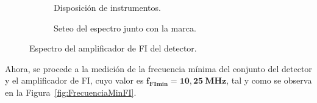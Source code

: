     \begin{figure}[H]
      \centering
      \begin{subfigure}[ht]{0.48\textwidth}
        \caption{Disposición de instrumentos.}
        \label{fig:InstrumentosParaFI}
      \end{subfigure}
      \hfill 
      \begin{subfigure}[ht]{0.48\textwidth}
        \caption{Seteo del espectro junto con la marca.}
        \label{fig:EspectroaFI}
      \end{subfigure}

      \caption{Espectro del amplificador de FI del detector.}
      \label{fig:MediccionEspectroFIDetector}
    \end{figure}

    Ahora, se procede a la medición de la frecuencia mínima del conjunto del detector y el amplificador de FI,
    cuyo valor es $\mathbf{f_{FImin} = 10,25~MHz}$, tal y como se observa en la Figura~\ref{fig:FrecuenciaMinFI}.

